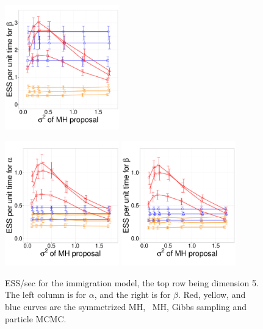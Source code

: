 \begin{figure}[H]
\begin{minipage}[hp]{0.65\linewidth}
    \includegraphics [width=0.44\textwidth, angle=0]{figs/q_5_beta.pdf}
  \end{minipage}
  \begin{minipage}[!hp]{0.33\linewidth}
    \caption{ESS/sec for the immigration model, the top row being dimension 5. The left column is for $\alpha$, and the 
    right is for $\beta$. Red, yellow, and blue curves are the symmetrized MH,
  \naive\ MH, Gibbs sampling and particle MCMC.}
     \label{fig:ESS_Q_D5}
  \end{minipage}
  \centering
  \begin{minipage}[!hp]{0.65\linewidth}
  \centering
    \includegraphics [width=0.44\textwidth, angle=0]{figs/pc_5_alpha.pdf}
    \includegraphics [width=0.44\textwidth, angle=0]{figs/pc_5_beta.pdf}

\end{minipage}
\end{figure}
